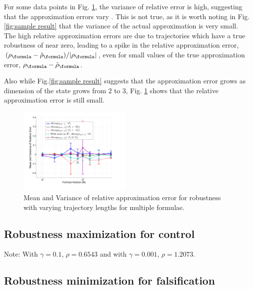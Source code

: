 For some data points in Fig. \ref{fig:relative error}, the variance of relative error is high, suggesting that the approximation errors vary . This is not true, as it is worth noting in Fig. \ref{fig:sample result} that the variance of the actual approximation is very small. The high relative approximation errors are due to trajectories which have a true robustness of near zero, leading to a spike in the relative approximation error, $(\robf-\srobf)/|\robf|$, even for small values of the true approximation error, $\robf-\srobf$.

Also while Fig.\ref{fig:sample result} suggests that the approximation error grows as dimension of the state grows from $2$ to $3$, Fig. \ref{fig:relative error} shows that the relative approximation error is still small. 

\begin{figure}[t]
\centering
\includegraphics[width=0.49\textwidth]{figures/RobustnessErrorRel}
\caption{Mean and Variance of relative approximation error for robustness with varying trajectory lengths for multiple formulae.}
\label{fig:relative error}
\end{figure}


\subsection{Robustness maximization for control}
\label{sec:toy example}
Note: With $\gamma=0.1$, $\rho=0.6543$ and with $\gamma=0.001$, $\rho=1.2073$.
\subsection{Robustness minimization for falsification}
\label{sec:toy falsification}
